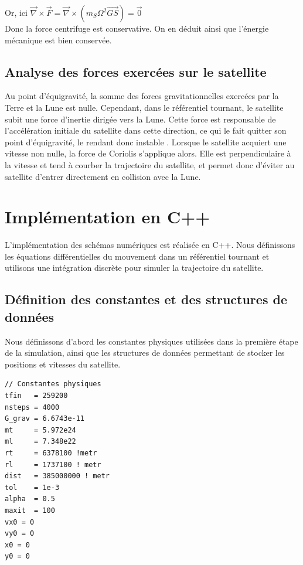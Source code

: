 \documentclass[a4paper,12pt,twoside]{article}
\begin{document}
Or, ici $\vec{\nabla}\times \vec{F} = \vec{\nabla}\times (m_S\Omega^2\vec{GS}) = \vec{0}$\\

Donc la force centrifuge est conservative. On  en déduit ainsi que l'énergie mécanique est bien conservée.

\subsection{Analyse des forces exercées sur le satellite}

Au point d’équigravité, la somme des forces gravitationnelles exercées par la Terre et la Lune est nulle. Cependant, dans le référentiel tournant, le satellite subit une force d’inertie dirigée vers la Lune. Cette force est responsable de l’accélération initiale du satellite dans cette direction, ce qui le fait quitter son point d'équigravité, le rendant donc instable . Lorsque le satellite acquiert une vitesse non nulle, la force de Coriolis s'applique alors. Elle est perpendiculaire à la vitesse et tend à courber la trajectoire du satellite, et permet donc d'éviter au satellite d'entrer directement en collision avec la Lune.

\section{Implémentation en C++}

L'implémentation des schémas numériques est réalisée en C++. Nous définissons les équations différentielles du mouvement dans un référentiel tournant et utilisons une intégration discrète pour simuler la trajectoire du satellite.

\subsection{Définition des constantes et des structures de données}

Nous définissons d'abord les constantes physiques utilisées dans la première étape de la simulation, ainsi que les structures de données permettant de stocker les positions et vitesses du satellite.

\begin{verbatim}
// Constantes physiques
tfin   = 259200 
nsteps = 4000
G_grav = 6.6743e-11
mt     = 5.972e24
ml     = 7.348e22
rt     = 6378100 !metr
rl     = 1737100 ! metr
dist   = 385000000 ! metr 
tol    = 1e-3
alpha  = 0.5
maxit  = 100
vx0 = 0
vy0 = 0
x0 = 0
y0 = 0

\end{verbatim}
\end{document}
